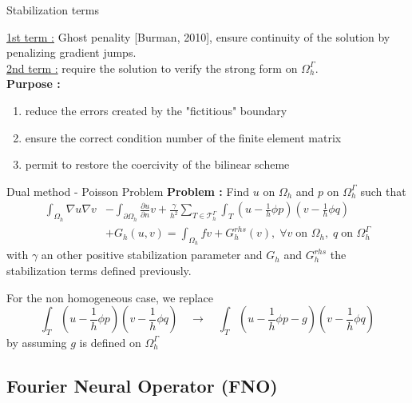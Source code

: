 \documentclass[compress,10pt,xcolor={table,dvipsnames},t]{beamer}
\begin{document}
	\begin{frame}{Stabilization terms}
		\begin{center}
			\centering
		\end{center}
		\small
		\underline{1st term :} Ghost penality [Burman, 2010], ensure continuity of the solution by penalizing gradient jumps. \\
		\underline{2nd term :} require the solution to verify the strong form on $\Omega_h^\Gamma$. \\
		\normalsize
		\textbf{Purpose :} 
		\begin{enumerate}[\ding{217}]
			\item reduce the errors created by the "fictitious" boundary 
			\item ensure the correct condition number of the finite element matrix
			\item permit to restore the coercivity of the bilinear scheme
		\end{enumerate}
	\end{frame}
			
	\begin{frame}{Dual method -  Poisson Problem}
		\textbf{Problem :} Find $u$ on $\Omega_h$ and $p$ on $\Omega_h^\Gamma$ such that
		\begin{align*}
			\int_{\Omega_h}\nabla u\nabla v&-\int_{\partial\Omega_h}\frac{\partial u}{\partial n} v + \frac{\gamma}{h^2} \sum_{T\in\mathcal{T}_h^\Gamma}\int_T \left(u-\frac{1}{h}\phi p\right)\left(v-\frac{1}{h}\phi q\right) \\
			&+ G_h(u,v) = \int_{\Omega_h}fv + G_h^{rhs}(v), \; \forall v \; \text{on } \Omega_h, \; q \; \text{on } \Omega_h^\Gamma
		\end{align*}
		with $\gamma$ an other positive stabilization parameter and $G_h$ and $G_h^{rhs}$ the stabilization terms defined previously.
		
		For the non homogeneous case, we replace
		$$\int_T \left(u-\frac{1}{h}\phi p\right)\left(v-\frac{1}{h}\phi q\right) \quad \rightarrow \quad \int_T\left(u-\frac{1}{h}\phi p-g\right)\left(v-\frac{1}{h}\phi q\right)$$ 
		by assuming $g$ is defined on $\Omega_h^\Gamma$
	\end{frame}

	\subsection{Fourier Neural Operator (FNO)}
\end{document}
